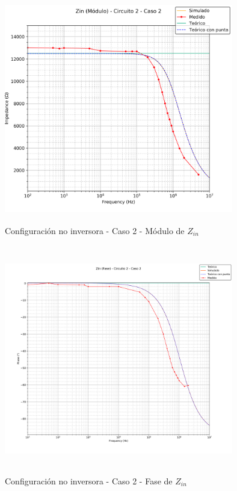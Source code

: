 \begin{figure}[H] %
	\centering
	\includegraphics[width=10cm,height=10cm,keepaspectratio]{../EJ1/00GRAFICOS/c2c2/c2c2ZINpunta.png}
	\caption{Configuración no inversora - Caso 2 - M\'odulo de $Z_{in}$}
	\label{c2c2zinM}
\end{figure}

\begin{figure}[H] %
	\centering
	\includegraphics[width=10cm,height=10cm,keepaspectratio]{../EJ1/00GRAFICOS/c2c2/c2c2zinFASE.png}
	\caption{Configuración no inversora - Caso 2 - Fase de $Z_{in}$}
	\label{c2c2zinP}
\end{figure}


